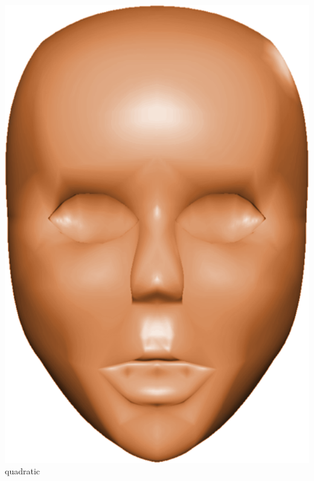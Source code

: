 \begin{frame}
\begin{columns}
\begin{column}{0.4\textwidth}
\begin{center}
				\includegraphics[width=\textwidth]{img/1_single/quadriticallyVaryingNormals.png}
				\small{quadratic}
			\end{center}	
		\end{column}
	\end{columns}
	\note{\textbf{[Rick]}}
\end{frame}


